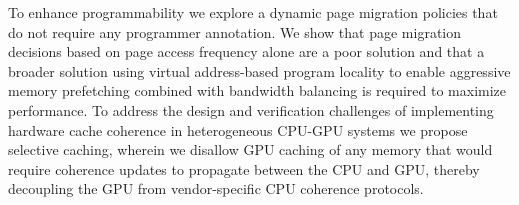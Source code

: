 To enhance programmability we explore a dynamic page migration policies that do
not require any programmer annotation.
We show that page migration decisions based on page access frequency
alone are a poor solution and that a broader solution using virtual
address-based program locality to enable aggressive memory prefetching combined
with bandwidth balancing is required to
maximize performance.
%
To address the design and verification challenges of implementing hardware cache
coherence in heterogeneous CPU-GPU systems 
we propose selective caching, wherein we disallow GPU caching of any memory that
would require coherence updates to propagate between the CPU and GPU, thereby
decoupling the GPU from vendor-specific CPU coherence protocols.

